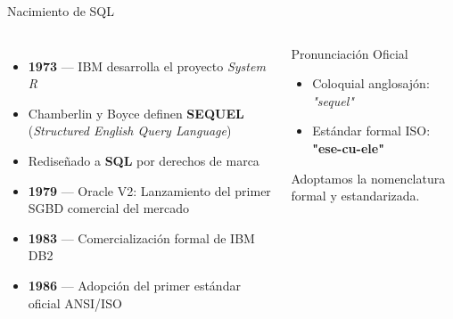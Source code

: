 \documentclass[12pt, aspectratio=169, UTF8]{beamer}
\begin{document}
\begin{frame}{Nacimiento de SQL}
  \begin{columns}[T]
      \begin{itemize}
        \item \textbf{1973} — IBM desarrolla el proyecto \emph{System R}
        \item Chamberlin y Boyce definen \textbf{SEQUEL} (\emph{Structured English Query Language})
        \item Rediseñado a \textbf{SQL} por derechos de marca
        \item \textbf{1979} — Oracle V2: Lanzamiento del primer SGBD comercial del mercado
        \item \textbf{1983} — Comercialización formal de IBM DB2
        \item \textbf{1986} — Adopción del primer estándar oficial ANSI/ISO
      \end{itemize}
      \begin{alertblock}{Pronunciación Oficial}
        \begin{itemize}
          \item Coloquial anglosajón: \textit{"sequel"}
          \item Estándar formal ISO: \textbf{"ese-cu-ele"}
        \end{itemize}
        Adoptamos la nomenclatura formal y estandarizada.
      \end{alertblock}
  \end{columns}
\end{frame}
\end{document}
